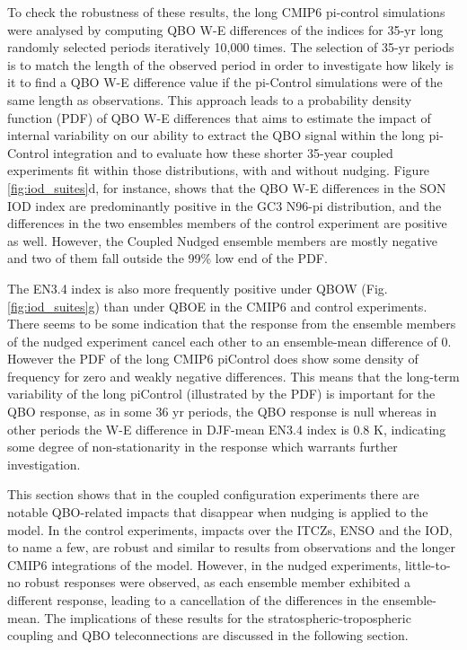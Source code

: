 To check the robustness of these results, the long CMIP6 pi-control simulations were analysed by computing QBO W-E differences of the indices for 35-yr long randomly selected periods iteratively 10,000 times. The selection of 35-yr periods is to match the length of the observed period in order to investigate how likely is it to find a QBO W-E difference value if the pi-Control simulations were of the same length as observations. This approach leads to a probability density function (PDF) of QBO W-E differences that aims to estimate the impact of internal variability on our ability to extract the QBO signal within the long pi-Control integration and to evaluate how these shorter 35-year coupled experiments fit within those distributions, with and without nudging. 
Figure \ref{fig:iod_suites}d, for instance, shows that the QBO W-E differences in the SON IOD index are predominantly positive in the GC3 N96-pi distribution, and the differences in the two ensembles members of the control experiment are positive as well. However, the Coupled Nudged ensemble members are mostly negative and two of them fall outside the 99\% low end of the PDF.


The EN3.4 index is also more frequently positive under QBOW (Fig. \ref{fig:iod_suites}g) than under QBOE in the CMIP6 and control experiments. There seems to be some indication that the response from the ensemble members of the nudged experiment cancel each other to an ensemble-mean difference of 0. 
However the PDF of the long CMIP6 piControl does show some density of frequency for zero and weakly negative differences.
This means that the long-term variability of the long piControl (illustrated by the PDF) is important for the QBO response, as in some 36 yr periods, the QBO response is null whereas in other periods the W-E difference in DJF-mean EN3.4 index is 0.8 K, indicating some degree of non-stationarity in the response which warrants further investigation.

This section shows that in the coupled configuration experiments there are notable
QBO-related impacts that disappear when nudging is applied to the model. In the control 
experiments, impacts over the ITCZs, ENSO and the IOD, to name a few, are robust and similar to results from observations and the longer CMIP6 integrations of the model. However, in the nudged experiments, little-to-no robust responses were observed, as each ensemble member exhibited a different response, leading to a cancellation of the differences in the ensemble-mean. The implications of these results for the stratospheric-tropospheric coupling and QBO teleconnections are discussed in the following section.  

